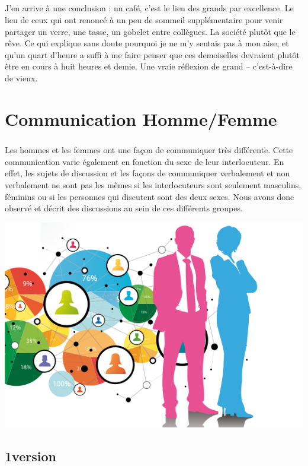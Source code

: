 \paragraph{}
J’en arrive à une conclusion : un café, c’est le lieu des grands par
excellence. Le lieu de ceux qui ont renoncé à un peu de sommeil supplémentaire
pour venir partager un verre, une tasse, un gobelet entre collègues. La société
plutôt que le rêve. Ce qui explique sans doute pourquoi je ne m’y sentais pas à
mon aise, et qu’un quart d’heure a suffi à me faire penser que ces demoiselles
devraient plutôt être en cours à huit heures et demie. Une vraie réflexion de
grand – c’est-à-dire de vieux.

\chapter{Communication Homme/Femme}
\paragraph{}
Les hommes et les femmes ont une façon de communiquer très différente. Cette communication varie également en fonction du sexe de leur interlocuteur. En effet, les sujets de discussion et les façons de communiquer verbalement et non verbalement ne sont pas les mêmes si les interlocuteurs sont seulement masculins, féminins ou si les personnes qui discutent sont des deux sexes. Nous avons donc observé et décrit des discussions au sein de ces différents groupes.
\begin{center}
\includegraphics[scale=0.7]{h-f.png}
\end{center}

\section{1\ier version}
